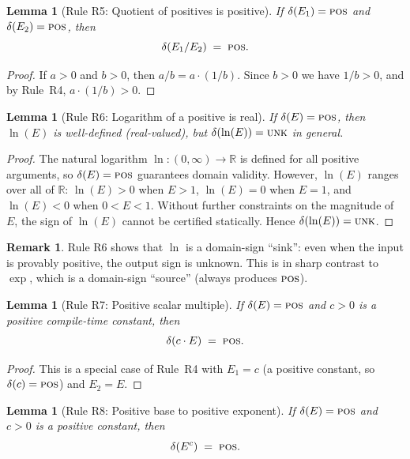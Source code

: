 \documentclass[12pt,a4paper]{article}
\newtheorem{lemma}[theorem]{Lemma}
\theoremstyle{definition}
\newtheorem{remark}[theorem]{Remark}
\newcommand{\POS}{\textsc{pos}}
\newcommand{\UNK}{\textsc{unk}}
\begin{document}
\begin{lemma}[Rule R5: Quotient of positives is positive]
\label{lem:R5}
If $\delta(E_1) = \POS$ and $\delta(E_2) = \POS$, then
\[
  \delta(E_1 / E_2) \;=\; \POS.
\]
\end{lemma}

\begin{proof}
If $a > 0$ and $b > 0$, then $a/b = a \cdot (1/b)$.  Since $b > 0$ we have
$1/b > 0$, and by Rule~R4, $a \cdot (1/b) > 0$.
\end{proof}

\begin{lemma}[Rule R6: Logarithm of a positive is real]
\label{lem:R6}
If $\delta(E) = \POS$, then $\ln(E)$ is well-defined (real-valued), but
$\delta(\ln(E)) = \UNK$ in general.
\end{lemma}

\begin{proof}
The natural logarithm $\ln : (0, \infty) \to \mathbb{R}$ is defined for all
positive arguments, so $\delta(E) = \POS$ guarantees domain validity.
However, $\ln(E)$ ranges over all of $\mathbb{R}$: $\ln(E) > 0$ when $E > 1$,
$\ln(E) = 0$ when $E = 1$, and $\ln(E) < 0$ when $0 < E < 1$.  Without further
constraints on the magnitude of $E$, the sign of $\ln(E)$ cannot be certified
statically.  Hence $\delta(\ln(E)) = \UNK$.
\end{proof}

\begin{remark}
Rule R6 shows that $\ln$ is a domain-sign ``sink'': even when the input is
provably positive, the output sign is unknown.  This is in sharp contrast to
$\exp$, which is a domain-sign ``source'' (always produces $\POS$).
\end{remark}

\begin{lemma}[Rule R7: Positive scalar multiple]
\label{lem:R7}
If $\delta(E) = \POS$ and $c > 0$ is a positive compile-time constant, then
\[
  \delta(c \cdot E) \;=\; \POS.
\]
\end{lemma}

\begin{proof}
This is a special case of Rule~R4 with $E_1 = c$ (a positive constant, so
$\delta(c) = \POS$) and $E_2 = E$.
\end{proof}

\begin{lemma}[Rule R8: Positive base to positive exponent]
\label{lem:R8}
If $\delta(E) = \POS$ and $c > 0$ is a positive constant, then
\[
  \delta(E^c) \;=\; \POS.
\]
\end{lemma}
\end{document}
